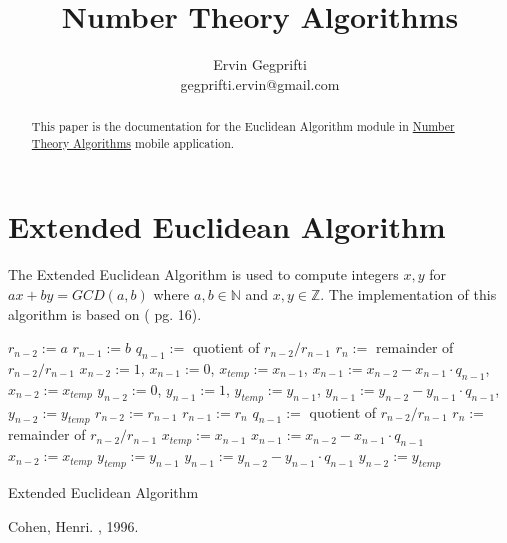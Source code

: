 \documentclass[12pt,oneside,a4paper]{article}
\title{Number Theory Algorithms}
\author{Ervin Gegprifti \\ [6pt]
	gegprifti.ervin@gmail.com}
\date{}
\begin{document}
\pagecolor{bgcolor}

\maketitle

\begin{abstract}
	This paper is the documentation for the Euclidean Algorithm module in \href{https://play.google.com/store/apps/details?id=com.gegprifti.android.numbertheoryalgorithms}{Number Theory Algorithms} mobile application.
\end{abstract}

\section*{Extended Euclidean Algorithm}	
The Extended Euclidean Algorithm is used to compute integers $x,y$ for $ax+by=GCD(a,b)$ where $a,b \in \mathbb{N}$ and $x,y \in \mathbb{Z}$. The implementation of this algorithm is based on (\cite{cohen1996course} pg. 16). \\

\begin{algorithm}[H]
\DontPrintSemicolon
\SetAlgoLined
{}
\BlankLine
$r_{n-2}:=a$ \;
$r_{n-1}:=b$ \;
$q_{n-1}:=$ quotient of $r_{n-2}/r_{n-1}$ \;
$r_n:=$ remainder of $r_{n-2}/r_{n-1}$ \;
$x_{n-2}:=1$, $x_{n-1}:=0$, $x_{temp}:=x_{n-1}$, $x_{n-1}:=x_{n-2} - x_{n-1} \cdot q_{n-1}$, $x_{n-2}:=x_{temp}$ \;
$y_{n-2}:=0$, $y_{n-1}:=1$, $y_{temp}:=y_{n-1}$, $y_{n-1}:=y_{n-2} - y_{n-1} \cdot q_{n-1}$, $y_{n-2}:=y_{temp}$ \;
\BlankLine
{}
{
	$r_{n-2}:=r_{n-1}$ \;
	$r_{n-1}:=r_n$ \;
	$q_{n-1}:=$ quotient of $r_{n-2}/r_{n-1}$ \;
	$r_n:=$ remainder of $r_{n-2}/r_{n-1}$ \;
	$x_{temp}:=x_{n-1}$ \;
	$x_{n-1}:=x_{n-2} - x_{n-1} \cdot q_{n-1}$ \;
	$x_{n-2}:=x_{temp}$ \;
	$y_{temp}:=y_{n-1}$ \;
	$y_{n-1}:=y_{n-2} - y_{n-1} \cdot q_{n-1}$ \;
	$y_{n-2}:=y_{temp}$ \;
}
\BlankLine
{}
\caption{Extended Euclidean Algorithm}
\end{algorithm}

\begin{thebibliography}{}
	Cohen, Henri.
	, 1996.
\end{thebibliography}
\end{document}

